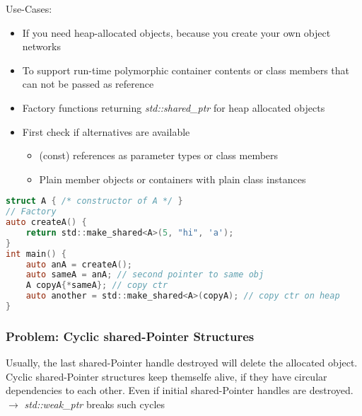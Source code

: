 \vspace{1em}

Use-Cases:
\begin{itemize}
    \item If you need heap-allocated objects, because you create your own object networks
    \item To support run-time polymorphic container contents or class members that can not be passed as reference
    \item Factory functions returning \textit{std::shared\_ptr} for heap allocated objects
    \item First check if alternatives are available
    \begin{itemize}
        \item (const) references as parameter types or class members
        \item Plain member objects or containers with plain class instances
    \end{itemize}
\end{itemize}

\begin{lstlisting}[style=frame, style= linenumbers, language=C]
struct A { /* constructor of A */ }
// Factory
auto createA() {
    return std::make_shared<A>(5, "hi", 'a');
}
int main() {
    auto anA = createA();
    auto sameA = anA; // second pointer to same obj
    A copyA{*sameA}; // copy ctr
    auto another = std::make_shared<A>(copyA); // copy ctr on heap
}
\end{lstlisting}

\subsubsection{Problem: Cyclic shared-Pointer Structures}
Usually, the last shared-Pointer handle destroyed will delete the allocated object.\\
Cyclic shared-Pointer structures keep themselfe alive, if they have circular dependencies to each other. Even if initial shared-Pointer handles are destroyed.
$\rightarrow$ \textit{std::weak\_ptr} breaks such cycles

